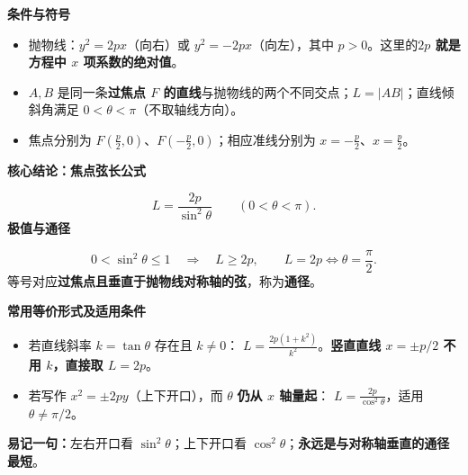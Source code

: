 \begin{statementbox}
\textbf{\textcolor{CStatement}{条件与符号}}\par\smallskip
\begin{itemize}[leftmargin=*,itemsep=.35em]
\item 抛物线：$y^2=2px$（向右）或 $y^2=-2px$（向左），其中 $p>0$。这里的\textbf{$2p$ 就是方程中 $x$ 项系数的绝对值}。
\item $A,B$ 是同一条\textbf{过焦点 $F$ 的直线}与抛物线的两个不同交点；$L=|AB|$；直线倾斜角满足 $0<\theta<\pi$（不取轴线方向）。
\item 焦点分别为 $F(\frac p2,0)$、$F(-\frac p2,0)$；相应准线分别为 $x=-\frac p2$、$x=\frac p2$。
\end{itemize}
\par\medskip
\textbf{\textcolor{CStatement}{核心结论：焦点弦长公式}}\par
\[
\boxed{\displaystyle L=\frac{2p}{\sin^2\theta}\qquad(0<\theta<\pi).}
\]
\textbf{\textcolor{CStatement}{极值与通径}}\par
\[
0<\sin^2\theta\leq1\quad\Longrightarrow\quad
\boxed{L\geq2p},\qquad L=2p\iff\theta=\frac\pi2.
\]
等号对应\textbf{过焦点且垂直于抛物线对称轴的弦}，称为\textbf{通径}。
\par\medskip
\textbf{\textcolor{CStatement}{常用等价形式及适用条件}}\par
\begin{itemize}[leftmargin=*,itemsep=.2em]
\item 若直线斜率 $k=\tan\theta$ 存在且 $k\ne0$：
$\displaystyle L=\frac{2p(1+k^2)}{k^2}$。\textbf{竖直直线 $x=\pm p/2$ 不用 $k$，直接取 $L=2p$}。
\item 若写作 $x^2=\pm2py$（上下开口），而 $\theta$ \textbf{仍从 $x$ 轴量起}：
$\displaystyle L=\frac{2p}{\cos^2\theta}$，适用 $\theta\ne\pi/2$。
\end{itemize}
\textbf{易记一句：}左右开口看 $\sin^2\theta$；上下开口看 $\cos^2\theta$；\textbf{永远是与对称轴垂直的通径最短}。
\end{statementbox}

